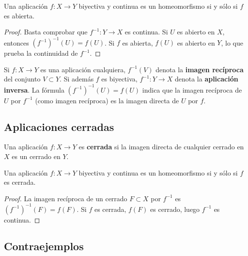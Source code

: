 \begin{proposición}
    Una aplicación $f: X \to Y$ biyectiva y continua es un homeomorfismo si y sólo si $f$ es abierta.
\end{proposición}
\begin{proof}
    Basta comprobar que $f^{-1}: Y \to X$ es continua. Si $U$ es abierto en $X$, entonces $(f^{-1})^{-1}(U) = f(U)$. Si $f$ es abierta, $f(U)$ es abierto en $Y$, lo que prueba la continuidad de $f^{-1}$.
\end{proof}

\begin{observación}
    Si $f: X \to Y$ es una aplicación cualquiera, $f^{-1}(V)$ denota la \textbf{imagen recíproca} del conjunto $V \subset Y$. Si además $f$ es biyectiva, $f^{-1}: Y \to X$ denota la \textbf{aplicación inversa}. La fórmula $(f^{-1})^{-1}(U) = f(U)$ indica que la imagen recíproca de $U$ por $f^{-1}$ (como imagen recíproca) es la imagen directa de $U$ por $f$.
\end{observación}

\subsection{Aplicaciones cerradas}

\begin{definición}
    Una aplicación $f: X \to Y$ es \textbf{cerrada} si la imagen directa de cualquier cerrado en $X$ es un cerrado en $Y$.
\end{definición}

\begin{proposición}
    Una aplicación $f: X \to Y$ biyectiva y continua es un homeomorfismo si y sólo si $f$ es cerrada.
\end{proposición}
\begin{proof}
    La imagen recíproca de un cerrado $F \subset X$ por $f^{-1}$ es $(f^{-1})^{-1}(F) = f(F)$. Si $f$ es cerrada, $f(F)$ es cerrado, luego $f^{-1}$ es continua.
\end{proof}

\subsection{Contraejemplos}


